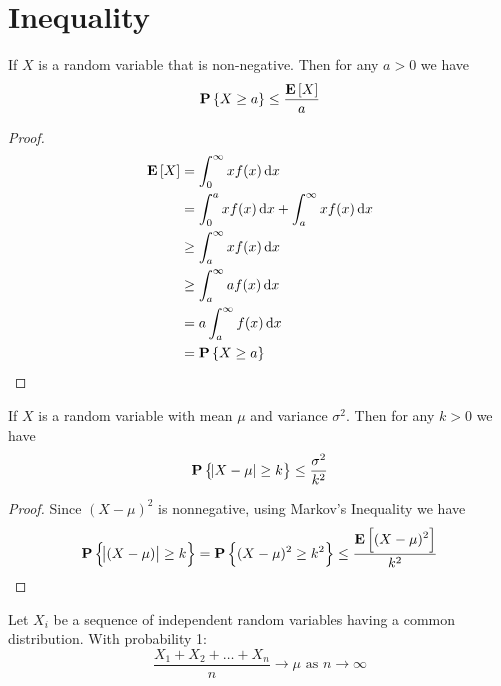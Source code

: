 
\section{Inequality}

\begin{theorem}
If $X$ is a random variable that is non-negative. Then for any $a > 0$ we have 
\begin{equation}
    \mathop{\bf P\/}\displaystyle \left\{X \geq a\right\} \leq \frac{\mathop{\bf E\/}\displaystyle \left[ X \right]}{a}
\end{equation}    
\end{theorem}
\begin{proof}
    \begin{equation*}
        \begin{aligned}
            \expect{X} &= \int_0^\infty x f(x) \dif{x} \\
            &= \int_0^a x f(x) \dif{x} + \int_a^\infty x f(x) \dif{x} \\
            & \geq \int_a^\infty x f(x) \dif{x} \\
            & \geq \int_a^\infty a f(x) \dif{x} \\
            &= a \int_a^\infty f(x) \dif{x} \\
            &= \probability{X \geq a}
        \end{aligned}
    \end{equation*}
\end{proof}

\begin{theorem}
    If $X$ is a random variable with mean $\mu$ and variance $\sigma^2$. Then for any $k > 0$ we have
    \begin{equation}
        \mathop{\bf P\/}\displaystyle \left\{\abs{X - \mu} \geq k \right\} \leq \frac{\sigma^2}{k^2}
    \end{equation}
\end{theorem}
\begin{proof}
    Since $(X - \mu)^2$ is nonnegative, using Markov's Inequality we have
    \begin{equation*}
        \mathop{\bf P\/}\displaystyle \left\{\abs{(X - \mu)} \geq k\right\} = \mathop{\bf P\/}\displaystyle \left\{(X - \mu)^2 \geq k^2\right\} \leq \frac{\mathop{\bf E\/}\displaystyle \left[ (X-\mu)^2 \right]}{k^2}
    \end{equation*}
\end{proof}

\begin{theorem}
    Let $X_i$ be a sequence of independent random variables having a common distribution. With probability 1:
    \begin{equation}
        \frac{X_1 + X_2 + \dots + X_n}{n} \rightarrow \mu \text{ as } n \rightarrow \infty
    \end{equation}
\end{theorem}

